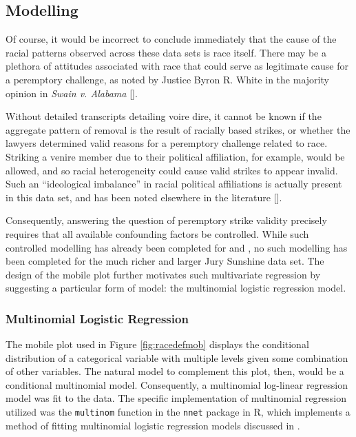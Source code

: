 \subsection{Modelling} \label{sec:mods}

Of course, it would be incorrect to conclude immediately that the cause of the racial patterns observed across these data sets is
race itself. There may be a plethora of attitudes associated with race that could serve as legitimate cause for a peremptory
challenge, as noted by Justice Byron R. White in the majority opinion in \textit{Swain v. Alabama} [\cite{swainvalabama}].

Without detailed transcripts detailing voire dire, it cannot be known if the aggregate pattern of removal is the result of racially based strikes, or whether the lawyers
determined valid reasons for a peremptory challenge related to race. Striking a venire member due to their political affiliation, for example, would be allowed, and so racial heterogeneity could cause valid strikes to appear invalid. Such an ``ideological imbalance'' in racial political affiliations is actually present in this data set, and has been noted elsewhere in the literature [\cite{revesz2016}].

Consequently, answering the question of peremptory strike validity precisely requires that all available confounding factors be controlled. While such controlled modelling has already been completed for \cite{StubbornLegacy} and \cite{PerempChalMurder}, no such modelling has been completed for the much richer and larger Jury Sunshine data set. The design of the mobile plot further motivates such multivariate regression by suggesting a particular form of model: the multinomial logistic regression model.

\subsubsection{Multinomial Logistic Regression}

The mobile plot used in Figure \ref{fig:racedefmob} displays the
conditional distribution of a categorical variable with multiple
levels given some combination of other variables. The natural model to
complement this plot, then, would be a conditional multinomial
model. Consequently, a multinomial log-linear regression
model was fit to the data. The specific implementation of multinomial regression utilized was the
\texttt{multinom} function in the \texttt{nnet} package in R, which implements a method of fitting multinomial logistic regression models discussed
in \cite{nnet}.

